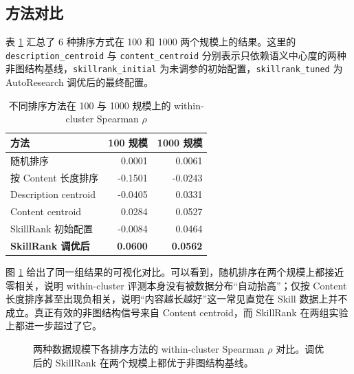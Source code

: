 \subsection{方法对比}

表 \ref{tab:ranking_comparison_real} 汇总了 6 种排序方式在 100 和 1000 两个规模上的结果。这里的 \texttt{description\_centroid} 与 \texttt{content\_centroid} 分别表示只依赖语义中心度的两种非图结构基线，\texttt{skillrank\_initial} 为未调参的初始配置，\texttt{skillrank\_tuned} 为 AutoResearch 调优后的最终配置。

\begin{table}[htbp]
\centering
\caption{不同排序方法在 100 与 1000 规模上的 within-cluster Spearman $\rho$}
\label{tab:ranking_comparison_real}
\begin{tabular}{lrr}
\toprule
方法 & 100 规模 & 1000 规模 \\
\midrule
随机排序 & 0.0001 & 0.0061 \\
按 Content 长度排序 & -0.1501 & -0.0243 \\
Description centroid & -0.0405 & 0.0331 \\
Content centroid & 0.0284 & 0.0527 \\
SkillRank 初始配置 & -0.0084 & 0.0464 \\
\textbf{SkillRank 调优后} & \textbf{0.0600} & \textbf{0.0562} \\
\bottomrule
\end{tabular}
\end{table}

图 \ref{fig:rho_bars_real} 给出了同一组结果的可视化对比。可以看到，随机排序在两个规模上都接近零相关，说明 within-cluster 评测本身没有被数据分布“自动抬高”；仅按 Content 长度排序甚至出现负相关，说明“内容越长越好”这一常见直觉在 Skill 数据上并不成立。真正有效的非图结构信号来自 Content centroid，而 SkillRank 在两组实验上都进一步超过了它。

\begin{figure}[htbp]
\centering
{}
\caption{两种数据规模下各排序方法的 within-cluster Spearman $\rho$ 对比。调优后的 SkillRank 在两个规模上都优于非图结构基线。}
\label{fig:rho_bars_real}
\end{figure}

